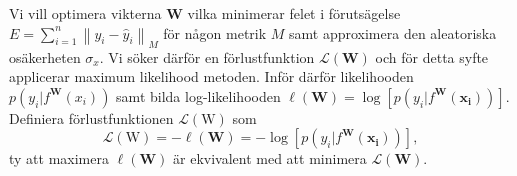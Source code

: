 Vi vill optimera vikterna $\mathbf{W}$ vilka minimerar felet i förutsägelse $E = \sum_{i=1}^n \left\|y_i - \hat{y}_i\right\|_M$ för någon metrik $M$ samt approximera den aleatoriska osäkerheten $\sigma_x$. Vi söker därför en förlustfunktion $\mathcal{L}(\mathbf{W})$ och för detta syfte applicerar maximum likelihood metoden. Inför därför likelihooden $p\left(y_i|f^\mathbf{W}(x_i)\right)$ samt bilda log-likelihooden $\ell(\mathbf{W}) = \log \left[p\left(y_i|f^\mathbf{W}(\mathbf{x_i})\right)\right]$. Definiera förlustfunktionen $\mathcal{L}(\mathrm{W})$ som 
\begin{equation}
    \mathcal{L}(\mathrm{W}) = -\ell(\mathbf{W}) = -\log \left[p\left(y_i|f^\mathbf{W}(\mathbf{x_i})\right)\right],
\label{eq:def_loss_fcn}
\end{equation}
ty att maximera $\ell(\mathbf{W})$ är ekvivalent med att minimera $\mathcal{L}(\mathbf{W})$.

